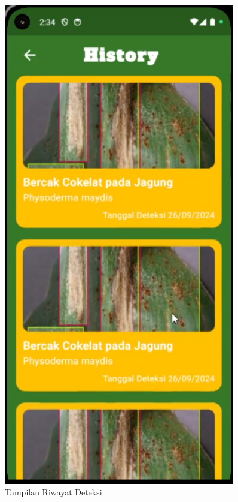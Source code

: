 \documentclass[journal,article,submit,pdftex,moreauthors]{Definitions/mdpi}
\begin{document}
\begin{itemize}
\begin{itemize}
\begin{figure}[H]
\begin{minipage}{0.3\textwidth}
                \includegraphics[width=0.9\textwidth]{Images/history_view.png}
                \caption{Tampilan Riwayat Deteksi}
                \label{fig:history-view}
            \end{minipage}
            \label{fig:combined-views}
        \end{figure}


\end{itemize}
\end{itemize}
\end{document}
